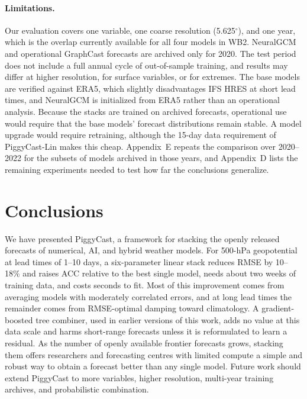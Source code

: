 \documentclass[twocol]{ametsocV6.1}
\newcommand{\PCLin}{PiggyCast-Lin}
\begin{document}
\paragraph{Limitations.} Our evaluation covers one variable, one coarse resolution (5.625$^\circ$), and one year, which is the overlap currently available for all four models in WB2. NeuralGCM and operational GraphCast forecasts are archived only for 2020. The test period does not include a full annual cycle of out-of-sample training, and results may differ at higher resolution, for surface variables, or for extremes. The base models are verified against ERA5, which slightly disadvantages IFS HRES at short lead times, and NeuralGCM is initialized from ERA5 rather than an operational analysis. Because the stacks are trained on archived forecasts, operational use would require that the base models' forecast distributions remain stable. A model upgrade would require retraining, although the 15-day data requirement of \PCLin{} makes this cheap. Appendix~E repeats the comparison over 2020--2022 for the subsets of models archived in those years, and Appendix~D lists the remaining experiments needed to test how far the conclusions generalize.

\section{Conclusions}

We have presented PiggyCast, a framework for stacking the openly released forecasts of numerical, AI, and hybrid weather models. For 500-hPa geopotential at lead times of 1--10 days, a six-parameter linear stack reduces RMSE by 10--18\% and raises ACC relative to the best single model, needs about two weeks of training data, and costs seconds to fit. Most of this improvement comes from averaging models with moderately correlated errors, and at long lead times the remainder comes from RMSE-optimal damping toward climatology. A gradient-boosted tree combiner, used in earlier versions of this work, adds no value at this data scale and harms short-range forecasts unless it is reformulated to learn a residual. As the number of openly available frontier forecasts grows, stacking them offers researchers and forecasting centres with limited compute a simple and robust way to obtain a forecast better than any single model. Future work should extend PiggyCast to more variables, higher resolution, multi-year training archives, and probabilistic combination.
\end{document}
